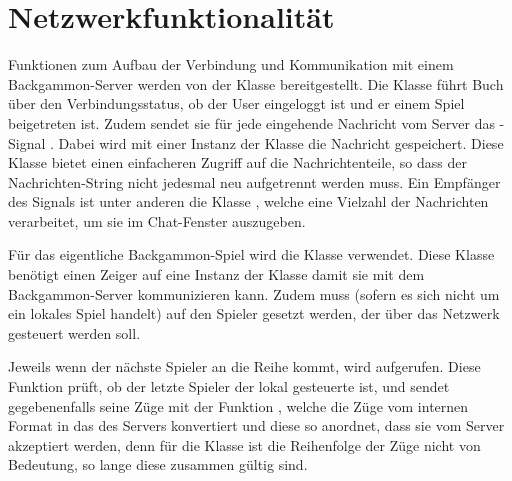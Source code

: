 \chapter{Netzwerkfunktionalität}
Funktionen zum Aufbau der Verbindung und Kommunikation mit einem Backgammon-Server werden von der Klasse  bereitgestellt. Die Klasse führt Buch über den Verbindungsstatus, ob der User eingeloggt ist und er einem Spiel beigetreten ist. Zudem sendet sie für jede eingehende Nachricht vom Server das -Signal . Dabei wird mit einer Instanz der Klasse  die Nachricht gespeichert. Diese Klasse bietet einen einfacheren Zugriff auf die Nachrichtenteile, so dass der Nachrichten-String nicht jedesmal neu aufgetrennt werden muss. Ein Empfänger des Signals ist unter anderen die Klasse , welche eine Vielzahl der Nachrichten verarbeitet, um sie im Chat-Fenster auszugeben.

Für das eigentliche Backgammon-Spiel wird die Klasse  verwendet. Diese Klasse benötigt einen Zeiger auf eine Instanz der Klasse  damit sie mit dem Backgammon-Server kommunizieren kann. Zudem muss (sofern es sich nicht um ein lokales Spiel handelt)  auf den Spieler gesetzt werden, der über das Netzwerk gesteuert werden soll.

Jeweils wenn der nächste Spieler an die Reihe kommt, wird  aufgerufen. Diese Funktion prüft, ob der letzte Spieler der lokal gesteuerte ist, und sendet gegebenenfalls seine Züge mit der Funktion , welche die Züge vom internen Format in das des Servers konvertiert und diese so anordnet, dass sie vom Server akzeptiert werden, denn für die Klasse  ist die Reihenfolge der Züge nicht von Bedeutung, so lange diese zusammen gültig sind.

